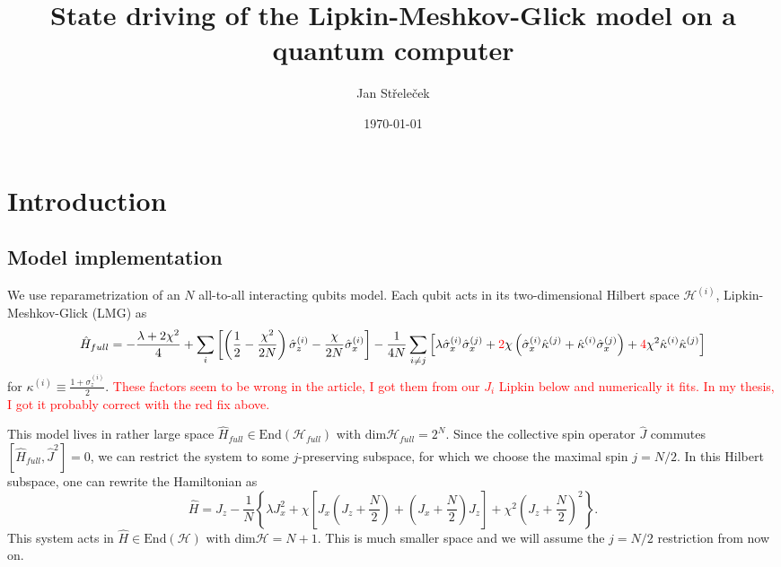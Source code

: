\documentclass[%
nofootinbib,
 amsmath,amssymb,
 aps,
 prd,
10pt]{revtex4-2}
\newcommand{\red}[1]{\textcolor{red}{#1}}
\renewcommand{\dim}{\mathrm{dim}}
\newcommand{\End}{\mathrm{End}}
\renewcommand{\H}{\hat{H}} %
\newcommand{\HH}{\mathcal{H}} %
\begin{document}
\title{State driving of the Lipkin-Meshkov-Glick model on a quantum computer}
\date{\today}
\author{Jan Střeleček}
\maketitle



\section{Introduction}
\subsection{Model implementation}

We use reparametrization of an $N$ all-to-all interacting qubits model. Each qubit acts in its two-dimensional Hilbert space $\HH^{(i)}$, Lipkin-Meshkov-Glick (LMG)\cite{Cejnar23} as
\begin{equation}
   \H_{full} = -\frac{\lambda + 2\chi^2}{4} + \sum_i \left[\left(\frac{1}{2} - \frac{\chi^2}{2N}\right)\hat{\sigma}_z^{(i)} - \frac{\chi}{2N}\hat{\sigma}_x^{(i)}\right] - \frac{1}{4N}\sum_{i\neq j}\left[\lambda\hat{\sigma}_x^{(i)}\hat{\sigma}_x^{(j)} + \red{2}\chi\left(\hat{\sigma}_x^{(i)}\hat{\kappa}^{(j)} + \hat{\kappa}^{(i)}\hat{\sigma}_x^{(j)}\right) + \red{4}\chi^2\hat{\kappa}^{(i)}\hat{\kappa}^{(j)}\right]
   \label{eq:hamiltonian_full}
\end{equation}
for $\kappa^{(i)}\equiv \frac{1+\sigma_z^{(i)}}{2}$. \red{These factors seem to be wrong in the article, I got them from our $J_i$ Lipkin below and numerically it fits. In my thesis, I got it probably correct with the red fix above.}

This model lives in rather large space $\H_{full}\in\End( \HH_{full})$ with $\dim \HH_{full}=2^N$. Since the collective spin operator $\hat J$ commutes $[\H_{full},\hat J^2]=0$, we can restrict the system to some $j$-preserving subspace, for which we choose the maximal spin $j=N/2$. In this Hilbert subspace, one can rewrite the Hamiltonian as\cite{Strelecek25}
\begin{equation}
    \H = J_z - \frac{1}{N}\left\{\lambda J_x^2 + \chi\left[J_x\left(J_z + \frac{N}{2}\right) + \left(J_x + \frac{N}{2}\right)J_z\right] + \chi^2\left(J_z + \frac{N}{2}\right)^2\right\}.
    \label{eq:hamiltonian_j_max}
\end{equation}
This system acts in $\H\in\End(\HH)$ with $\dim\HH=N+1$. This is much smaller space and we will assume the $j=N/2$ restriction from now on.
\end{document}
